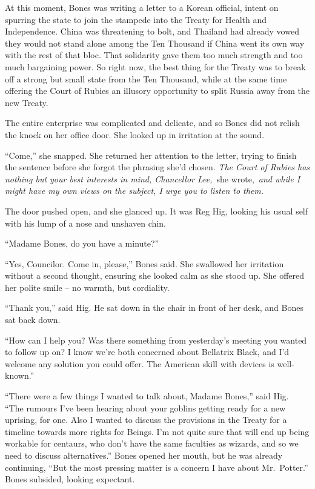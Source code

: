 At this moment, Bones was writing a letter to a Korean official, intent
on spurring the state to join the stampede into the Treaty for Health
and Independence. China was threatening to bolt, and Thailand had
already vowed they would not stand alone among the Ten Thousand if China
went its own way with the rest of that bloc. That solidarity gave them
too much strength and too much bargaining power. So right now, the best
thing for the Treaty was to break off a strong but small state from the
Ten Thousand, while at the same time offering the Court of Rubies an
illusory opportunity to split Russia away from the new Treaty.

The entire enterprise was complicated and delicate, and so Bones did not
relish the knock on her office door. She looked up in irritation at the
sound.

``Come,'' she snapped. She returned her attention to the letter, trying
to finish the sentence before she forgot the phrasing she'd chosen.
\emph{The Court of Rubies has nothing but your best interests in mind,
Chancellor Lee,}~she wrote,~\emph{and while I might have my own views on
the subject, I urge you to listen to them.}

The door pushed open, and she glanced up. It was Reg Hig, looking his
usual self with his lump of a nose and unshaven chin.

``Madame Bones, do you have a minute?''

``Yes, Councilor. Come in, please,'' Bones said. She swallowed her
irritation without a second thought, ensuring she looked calm as she
stood up. She offered her polite smile -- no warmth, but cordiality.

``Thank you,'' said Hig. He sat down in the chair in front of her desk,
and Bones sat back down.

``How can I help you? Was there something from yesterday's meeting you
wanted to follow up on? I know we're both concerned about Bellatrix
Black, and I'd welcome any solution you could offer. The American skill
with devices is well-known.''

``There were a few things I wanted to talk about, Madame Bones,'' said
Hig. ``The rumours I've been hearing about your goblins getting ready
for a new uprising, for one. Also I wanted to discuss the provisions in
the Treaty for a timeline towards more rights for Beings. I'm not quite
sure that will end up being workable for centaurs, who don't have the
same faculties as wizards, and so we need to discuss alternatives.''
Bones opened her mouth, but he was already continuing, ``But the most
pressing matter is a concern I have about Mr.~Potter.'' Bones subsided,
looking expectant.

